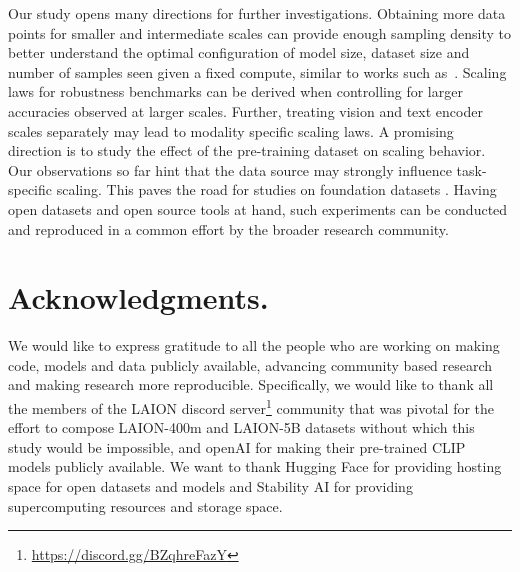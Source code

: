 \documentclass[11pt,table]{article}
\newcommand{\citep}{\cite}
\begin{document}
Our study opens many directions for further investigations. Obtaining more data points for smaller and intermediate scales can provide enough sampling density to better understand the optimal configuration of model size, dataset size and number of samples seen given a fixed compute, similar to works such as~\cite{hoffmann2022training, koppula2022should}. Scaling laws for robustness benchmarks \citep{Taori2020} can be derived when controlling for larger accuracies observed at larger scales. Further, treating vision and text encoder scales separately may lead to modality specific scaling laws. A promising direction is to study the effect of the pre-training dataset on scaling behavior. Our observations so far hint that the data source may strongly influence task-specific scaling. This paves the road for studies on foundation datasets \citep{sorscher2022beyond}. %
Having open datasets \citep{schuhmann2021laion,Schuhmann2022} and open source tools \citep{ilharco_gabriel_2021_5143773} at hand, such experiments can be conducted and reproduced in a common effort by the broader research community.   



\section*{Acknowledgments.}
We would like to express gratitude to all the people who are working on making code, models and data publicly available, advancing community based research and making research more reproducible. Specifically, we would like to thank all the members of the LAION discord server\footnote{\url{https://discord.gg/BZqhreFazY}} community that was pivotal for the effort to compose LAION-400m and LAION-5B datasets without which this study would be impossible, and openAI for making their pre-trained CLIP models publicly available. We want to thank Hugging Face for providing hosting space for open datasets and models and Stability AI for providing supercomputing resources and storage space.
\end{document}
